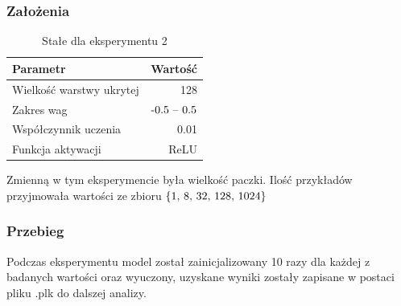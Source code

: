 \documentclass{article}
\begin{document}
\subsubsection*{Założenia}
\begin{table}[H]
	\caption{Stałe dla eksperymentu 2}
	\label{tabela-const-2}
	\centering
	\begin{tabular}{lr}
		\toprule
		Parametr                   & Wartość         \\
		\midrule
		Wielkość warstwy ukrytej & 128               \\
		Zakres wag                 & \($-0.5 -- 0.5$\) \\
		Współczynnik uczenia     & 0.01              \\
		Funkcja aktywacji          & ReLU              \\
		\bottomrule
	\end{tabular}
\end{table}

Zmienną w tym eksperymencie była wielkość paczki. Ilość przykładów przyjmowała wartości ze zbioru \(\{$1, 8, 32, 128, 1024$\}\)
\subsubsection*{Przebieg}

Podczas eksperymentu model został zainicjalizowany 10 razy dla każdej z badanych wartości oraz wyuczony, uzyskane wyniki zostały zapisane w postaci pliku .plk do dalszej analizy.
\end{document}
